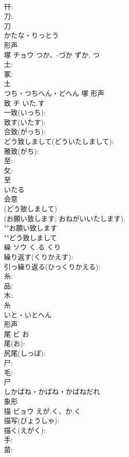\documentclass[8pt]{extreport}
\begin{document}
\begin{CJK}{UTF8}{min}
\\	幵: 
\\	刀: 
\\	刀	
\\	かたな・りっとう	
\\	形声 
\\	塚	チョウ	つか、-づか	ずか, つ	
\\	土: 
\\	冢: 
\\	土	
\\	つち・つちへん・どへん	塚	形声 
\\	致	チ	いた.す		
\\	一致(いっち): 
\\	致す(いたす): 
\\	合致(がっち): 
\\	どう致しまして(どういたしまして): 
\\	雅致(がち): 
\\	至: 
\\	攵: 
\\	至	
\\	いたる	
\\	会意 
\\	(どう致しまして) 
\\	(お願い致します; おねがいいたします). 
\\	""お願い致します
\\	""どう致しまして
\\	繰	ソウ	く.る	くり	
\\	繰り返す(くりかえす): 
\\	引っ繰り返る(ひっくりかえる): 
\\	糸: 
\\	品: 
\\	木: 
\\	糸	
\\	いと・いとへん	
\\	形声 
\\	尾	ビ	お		
\\	尾(お): 
\\	尻尾(しっぽ): 
\\	尸: 
\\	毛: 
\\	尸	
\\	しかばね・かばね・かばねだれ	
\\	象形 
\\	描	ビョウ	えが.く、か.く		
\\	描写(びょうしゃ): 
\\	描く(えがく): 
\\	手: 
\\	苗: 

\end{CJK}
\end{document}
